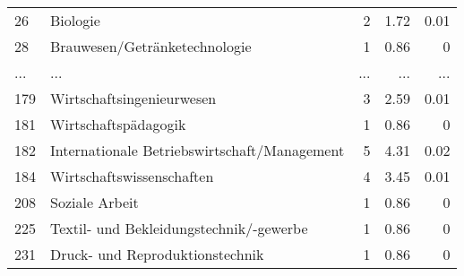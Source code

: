 \begin{longtable}{lXrrr}
        26 & \multicolumn{1}{X}{Biologie} & %
          \num{2} &
          \num[round-mode=places,round-precision=2]{1,72} &
          \num[round-mode=places,round-precision=2]{0,01} \\
        28 & \multicolumn{1}{X}{Brauwesen/Getränketechnologie} & %
          \num{1} &
          \num[round-mode=places,round-precision=2]{0,86} &
          \num[round-mode=places,round-precision=2]{0} \\
       ... & ... & ... & ... & ... \\
        179 & \multicolumn{1}{X}{Wirtschaftsingenieurwesen} & %
          \num{3} &
          \num[round-mode=places,round-precision=2]{2,59} &
          \num[round-mode=places,round-precision=2]{0,01} \\

        181 & \multicolumn{1}{X}{Wirtschaftspädagogik} & %
          \num{1} &
          \num[round-mode=places,round-precision=2]{0,86} &
          \num[round-mode=places,round-precision=2]{0} \\

        182 & \multicolumn{1}{X}{Internationale Betriebswirtschaft/Management} & %
          \num{5} &
          \num[round-mode=places,round-precision=2]{4,31} &
          \num[round-mode=places,round-precision=2]{0,02} \\

        184 & \multicolumn{1}{X}{Wirtschaftswissenschaften} & %
          \num{4} &
          \num[round-mode=places,round-precision=2]{3,45} &
          \num[round-mode=places,round-precision=2]{0,01} \\

        208 & \multicolumn{1}{X}{Soziale Arbeit} & %
          \num{1} &
          \num[round-mode=places,round-precision=2]{0,86} &
          \num[round-mode=places,round-precision=2]{0} \\

        225 & \multicolumn{1}{X}{Textil- und Bekleidungstechnik/-gewerbe} & %
          \num{1} &
          \num[round-mode=places,round-precision=2]{0,86} &
          \num[round-mode=places,round-precision=2]{0} \\

        231 & \multicolumn{1}{X}{Druck- und Reproduktionstechnik} & %
          \num{1} &
          \num[round-mode=places,round-precision=2]{0,86} &
          \num[round-mode=places,round-precision=2]{0} \\


\end{longtable}
